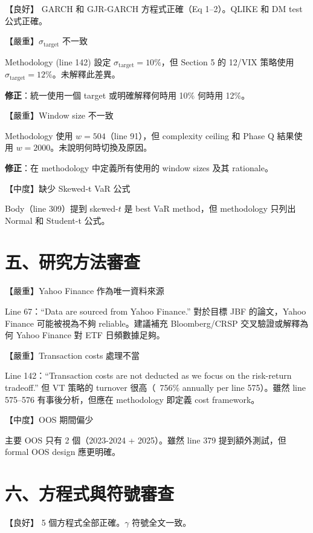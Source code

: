 \documentclass[12pt,a4paper]{article}
\begin{document}
\textcolor{okgreen}{【良好】} GARCH 和 GJR-GARCH 方程式正確（Eq 1--2）。QLIKE 和 DM test 公式正確。

\textcolor{errorred}{【嚴重】$\sigma_{\text{target}}$ 不一致}

Methodology (line 142) 設定 $\sigma_{\text{target}} = 10\%$，但 Section 5 的 12/VIX 策略使用 $\sigma_{\text{target}} = 12\%$。未解釋此差異。

\textbf{修正}：統一使用一個 target 或明確解釋何時用 10\% 何時用 12\%。

\bigskip
\textcolor{errorred}{【嚴重】Window size 不一致}

Methodology 使用 $w = 504$（line 91），但 complexity ceiling 和 Phase Q 結果使用 $w = 2000$。未說明何時切換及原因。

\textbf{修正}：在 methodology 中定義所有使用的 window sizes 及其 rationale。

\bigskip
\textcolor{warncolor}{【中度】缺少 Skewed-t VaR 公式}

Body（line 309）提到 skewed-$t$ 是 best VaR method，但 methodology 只列出 Normal 和 Student-t 公式。

\section*{五、研究方法審查}

\textcolor{errorred}{【嚴重】Yahoo Finance 作為唯一資料來源}

Line 67：``Data are sourced from Yahoo Finance.'' 對於目標 JBF 的論文，Yahoo Finance 可能被視為不夠 reliable。建議補充 Bloomberg/CRSP 交叉驗證或解釋為何 Yahoo Finance 對 ETF 日頻數據足夠。

\bigskip
\textcolor{errorred}{【嚴重】Transaction costs 處理不當}

Line 142：``Transaction costs are not deducted as we focus on the risk-return tradeoff.'' 但 VT 策略的 turnover 很高（~756\% annually per line 575）。雖然 line 575--576 有事後分析，但應在 methodology 即定義 cost framework。

\bigskip
\textcolor{warncolor}{【中度】OOS 期間偏少}

主要 OOS 只有 2 個（2023-2024 + 2025）。雖然 line 379 提到額外測試，但 formal OOS design 應更明確。

\section*{六、方程式與符號審查}

\textcolor{okgreen}{【良好】} 5 個方程式全部正確。$\gamma$ 符號全文一致。
\end{document}
